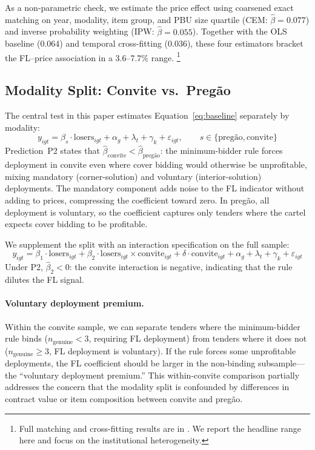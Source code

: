 As a non-parametric check, we estimate the price effect using
coarsened exact matching on year, modality, item group, and PBU
size quartile (CEM: $\hat{\beta} = 0.077$) and inverse probability
weighting (IPW: $\hat{\beta} = 0.055$). Together with the OLS
baseline (0.064) and temporal cross-fitting (0.036), these four
estimators bracket the FL--price association in a 3.6--7.7\% range.%
\footnote{Full matching and cross-fitting results are in
\citet{genicolomartins2026screening}. We report the headline range
here and focus on the institutional heterogeneity.}

\subsection{Modality Split: Convite vs.\ Preg\~ao}
\label{sec:modality_split}

The central test in this paper estimates
Equation~\eqref{eq:baseline} separately by modality:
\begin{equation}
  y_{igt} = \beta_s \cdot \text{losers}_{igt}
  + \alpha_g + \lambda_t + \gamma_k + \varepsilon_{igt},
  \qquad s \in \{\text{preg\~ao}, \text{convite}\}
  \label{eq:modality_split}
\end{equation}
Prediction~P2 states that $\hat{\beta}_{\text{convite}} <
\hat{\beta}_{\text{preg\~ao}}$: the minimum-bidder rule forces
deployment in convite even where cover bidding would otherwise be
unprofitable, mixing mandatory (corner-solution) and voluntary
(interior-solution) deployments. The mandatory component adds noise
to the FL indicator without adding to prices, compressing the
coefficient toward zero. In preg\~ao, all deployment is voluntary,
so the coefficient captures only tenders where the cartel expects
cover bidding to be profitable.

We supplement the split with an interaction specification on the
full sample:
\begin{equation}
  y_{igt} = \beta_1 \cdot \text{losers}_{igt}
  + \beta_2 \cdot \text{losers}_{igt} \times \text{convite}_{igt}
  + \delta \cdot \text{convite}_{igt}
  + \alpha_g + \lambda_t + \gamma_k + \varepsilon_{igt}
  \label{eq:interaction}
\end{equation}
Under P2, $\hat{\beta}_2 < 0$: the convite interaction is
negative, indicating that the rule dilutes the FL signal.

\paragraph{Voluntary deployment premium.}
Within the convite sample, we can separate tenders where the
minimum-bidder rule binds ($n_{\text{genuine}} < 3$, requiring FL
deployment) from tenders where it does not ($n_{\text{genuine}} \geq
3$, FL deployment is voluntary). If the rule forces some
unprofitable deployments, the FL coefficient should be larger in
the non-binding subsample---the ``voluntary deployment premium.''
This within-convite comparison partially addresses the concern that
the modality split is confounded by differences in contract value
or item composition between convite and preg\~ao.


